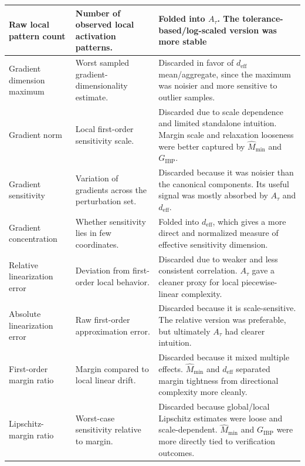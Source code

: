 \documentclass{article}
\theoremstyle{definition}
\begin{document}
\begin{table}[h]
\begin{tabularx}{\textwidth}{
@{}
>{\raggedright\arraybackslash}p{}
>{\raggedright\arraybackslash}p{}
>{\raggedright\arraybackslash}X
@{}}
Raw local pattern count
& Number of observed local activation patterns.
& Folded into $A_\tau$. The tolerance-based/log-scaled version was more stable \\
\hline

Gradient dimension maximum
& Worst sampled gradient-dimensionality estimate.
& Discarded in favor of $d_{\mathrm{eff}}$ mean/aggregate, since the maximum was noisier and more sensitive to outlier samples. \\
\hline

Gradient norm
& Local first-order sensitivity scale.
& Discarded due to scale dependence and limited standalone intuition. Margin scale and relaxation looseness were better captured by $\widehat M_{\min}$ and $G_{\mathrm{IBP}}$. \\
\hline

Gradient sensitivity
& Variation of gradients across the perturbation set.
& Discarded because it was noisier than the canonical components. Its useful signal was mostly absorbed by $A_\tau$ and $d_{\mathrm{eff}}$. \\
\hline

Gradient concentration
& Whether sensitivity lies in few coordinates.
& Folded into $d_{\mathrm{eff}}$, which gives a more direct and normalized measure of effective sensitivity dimension. \\
\hline

Relative linearization error
& Deviation from first-order local behavior.
& Discarded due to weaker and less consistent correlation. $A_\tau$ gave a cleaner proxy for local piecewise-linear complexity. \\
\hline

Absolute linearization error
& Raw first-order approximation error.
& Discarded because it is scale-sensitive. The relative version was preferable, but ultimately $A_\tau$ had clearer intuition. \\
\hline

First-order margin ratio
& Margin compared to local linear drift.
& Discarded because it mixed multiple effects. $\widehat M_{\min}$ and $d_{\mathrm{eff}}$ separated margin tightness from directional complexity more cleanly. \\
\hline

Lipschitz-margin ratio
& Worst-case sensitivity relative to margin.
& Discarded because global/local Lipschitz estimates were loose and scale-dependent. $\widehat M_{\min}$ and $G_{\mathrm{IBP}}$ were more directly tied to verification outcomes. \\
\hline


\end{tabularx}
\end{table}
\end{document}
